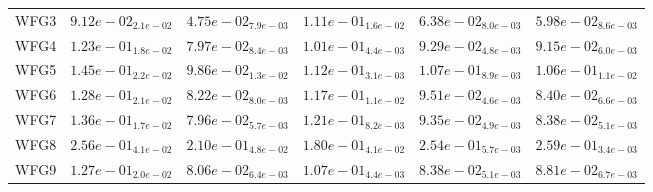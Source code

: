 \documentclass{article}
\begin{document}
\begin{table}
\begin{scriptsize}
\begin{tabular}{llllll}
WFG3 & $  9.12e-02_{ 2.1e-02}$ & \cellcolor{gray95}$  4.75e-02_{ 7.9e-03}$ & $  1.11e-01_{ 1.6e-02}$ & $  6.38e-02_{ 8.0e-03}$ & \cellcolor{gray25}$  5.98e-02_{ 8.6e-03}$ \\
WFG4 & $  1.23e-01_{ 1.8e-02}$ & \cellcolor{gray95}$  7.97e-02_{ 8.4e-03}$ & $  1.01e-01_{ 4.4e-03}$ & $  9.29e-02_{ 4.8e-03}$ & \cellcolor{gray25}$  9.15e-02_{ 6.0e-03}$ \\
WFG5 & $  1.45e-01_{ 2.2e-02}$ & \cellcolor{gray95}$  9.86e-02_{ 1.3e-02}$ & $  1.12e-01_{ 3.1e-03}$ & $  1.07e-01_{ 8.9e-03}$ & \cellcolor{gray25}$  1.06e-01_{ 1.1e-02}$ \\
WFG6 & $  1.28e-01_{ 2.1e-02}$ & \cellcolor{gray95}$  8.22e-02_{ 8.0e-03}$ & $  1.17e-01_{ 1.1e-02}$ & $  9.51e-02_{ 4.6e-03}$ & \cellcolor{gray25}$  8.40e-02_{ 6.6e-03}$ \\
WFG7 & $  1.36e-01_{ 1.7e-02}$ & \cellcolor{gray95}$  7.96e-02_{ 5.7e-03}$ & $  1.21e-01_{ 8.2e-03}$ & $  9.35e-02_{ 4.9e-03}$ & \cellcolor{gray25}$  8.38e-02_{ 5.1e-03}$ \\
WFG8 & $  2.56e-01_{ 4.1e-02}$ & \cellcolor{gray25}$  2.10e-01_{ 4.8e-02}$ & \cellcolor{gray95}$  1.80e-01_{ 4.1e-02}$ & $  2.54e-01_{ 5.7e-03}$ & $  2.59e-01_{ 3.4e-03}$ \\
WFG9 & $  1.27e-01_{ 2.0e-02}$ & \cellcolor{gray95}$  8.06e-02_{ 6.4e-03}$ & $  1.07e-01_{ 4.4e-03}$ & \cellcolor{gray25}$  8.38e-02_{ 5.1e-03}$ & $  8.81e-02_{ 6.7e-03}$ \\
\hline
\end{tabular}
\end{scriptsize}
\end{table}
\end{document}
